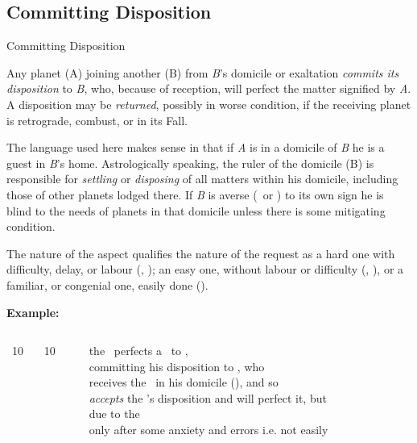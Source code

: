 \subsection{Committing Disposition}
\begin{frame}[t]{Committing Disposition}
\small
\begin{block}{}
Any planet (A) joining another (B) from \textsl{B}'s domicile or exaltation \textsl{commits its disposition} to \textsl{B}, who, because of reception, will perfect the matter signified by \textsl{A}. A disposition may be \textsl{returned}, possibly in worse condition, if the receiving planet is retrograde, combust, or in its Fall. 
\end{block}

The language used here makes sense in that if \textsl{A} is in a domicile of \textsl{B} he is a guest in \textsl{B}'s home. Astrologically speaking, the ruler of the domicile (B) is responsible for \textsl{settling} or \textsl{disposing} of all matters within his domicile, including those of other planets lodged there. If \textsl{B} is averse (\Semisextile\ or \Quincunx) to its own sign he is blind to the needs of planets in that domicile unless there is some mitigating condition.

The nature of the aspect qualifies the nature of the request as a hard one with difficulty, delay, or labour (\Square, \Opposition); an easy one, without labour or difficulty (\Sextile, \Trine), or a familiar, or congenial one, easily done (\Conjunction).

\textbf{Example:}
\begin{columns}[T, onlytextwidth]
\Sun\ 10 \Aries\ \Square\ \Mars\ 10 \Capricorn

\rule{.1mm}{.27\textheight}

the \Sun\ perfects a \Square\  to \Mars, \\
committing his disposition to \Mars, who  \\
receives the \Sun\ in his domicile (\Aries), and so \\
\textsl{accepts} the \Sun's disposition and will perfect it, but \\
due to the \Square\, \\ 
only after some anxiety and errors i.e. not easily
\end{columns}
\end{frame}
